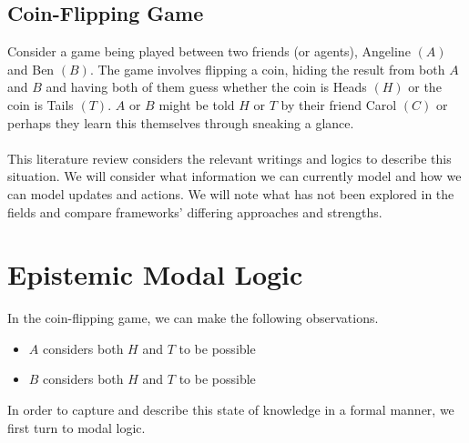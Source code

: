 \documentclass[12pt, a4paper, twoside]{article}
\begin{document}
\subsection{Coin-Flipping Game}\label{intro_coinFlipping}
Consider a game being played between two friends (or agents), Angeline $(A)$
and Ben $(B)$.
The game involves flipping a coin, hiding the result from both $A$ and $B$ and
having both of them guess whether the coin is Heads $(H)$ or the coin is Tails
$(T)$.
$A$ or $B$ might be told $H$ or $T$ by their friend Carol $(C)$ or perhaps they
learn this themselves through sneaking a glance.\\
\\
This literature review considers the relevant writings and logics to describe
this situation.
We will consider what information we can currently model and how we can model
updates and actions.
We will note what has not been explored in the fields and compare frameworks'
differing approaches and strengths.

\section{Epistemic Modal Logic}\label{epistemic}
In the coin-flipping game, we can make the following observations.
\begin{itemize}
	\item $A$ considers both $H$ and $T$ to be possible
	\item $B$ considers both $H$ and $T$ to be possible
\end{itemize}
In order to capture and describe this state of knowledge in a formal manner, we
first turn to modal logic.
\end{document}
